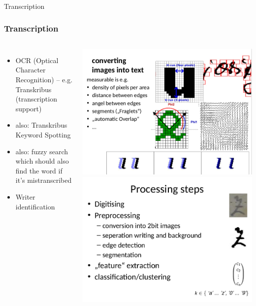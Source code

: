 \begin{frame}{Transcription}
\subsubsection{Transcription}

\begin{columns}
\begin{itemize}\small
\item  OCR (Optical Character Recognition) -- e.g. Transkribus (transcription support)
\item  also:  Transkribus Keyword Spotting 
\item  also:  fuzzy search which should also find the word if it's mistranscribed
\item  Writer identification
\end{itemize}


\includegraphics[width=\textwidth]{img/ocr1.png}
\includegraphics[width=\textwidth]{img/ocr2.png}
\end{columns}


\end{frame}
